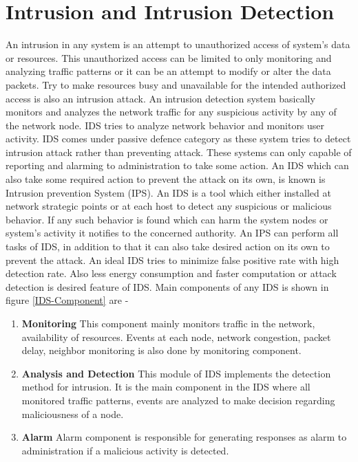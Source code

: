 \section{Intrusion and Intrusion Detection}
An intrusion in any system is an attempt to unauthorized access of system's data or resources. This unauthorized access can be limited to only monitoring and analyzing traffic patterns or it can be an attempt to modify or alter the data packets. Try to make resources busy and unavailable for the intended authorized access is also an intrusion attack. An intrusion detection system basically monitors and analyzes the network traffic for any suspicious activity by any of the network node. IDS tries to analyze network behavior and monitors user activity. IDS comes under passive defence category as these system tries to detect intrusion attack rather than preventing attack. These systems can only capable of reporting and alarming to administration to take some action. An IDS which can also take some required action to prevent the attack on its own, is known is Intrusion prevention System (IPS). An IDS is a tool which either installed at network strategic points or at each host to detect any suspicious or malicious behavior. If any such behavior is found which can harm the system nodes or system's activity it notifies to the concerned authority. An IPS can perform all tasks of IDS, in addition to that it can also take desired action on its own to prevent the attack. An ideal IDS tries to minimize false positive rate with high detection rate. Also less energy consumption and faster computation or attack detection is desired feature of IDS. Main components of any IDS is shown in figure \ref{IDS-Component} \cite{alrajeh2013intrusion} are -
\begin{enumerate}[label=\textbf{\roman*.}]
\item \textbf{Monitoring} This component mainly monitors traffic in the network, availability of resources. Events at each node, network congestion, packet delay, neighbor monitoring is also done by monitoring component.
\item \textbf{Analysis and Detection} This module of IDS implements the detection method for intrusion. It is the main component in the IDS where all monitored traffic patterns, events are analyzed to make decision regarding maliciousness of a node.
\item \textbf{Alarm} Alarm component is responsible for generating responses as alarm to administration if a malicious activity is detected.
\end{enumerate}
